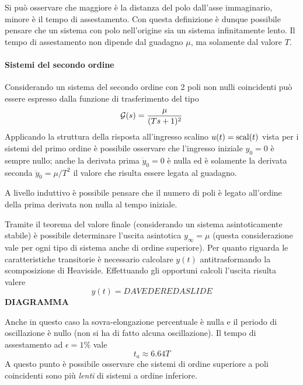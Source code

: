 		\begin{nota}
			Si può osservare che maggiore è la distanza del polo dall'asse immaginario, minore è il tempo di assestamento. Con questa definizione è dunque possibile pensare che un sistema con polo nell'origine sia un sistema infinitamente lento. Il tempo di assestamento non dipende dal guadagno $\mu$, ma solamente dal valore $T$.
		\end{nota}
		
		
		\paragraph{Sistemi del secondo ordine} Considerando un sistema del secondo ordine con 2 poli non nulli  coincidenti può essere espresso dalla funzione di trasferimento del tipo
		\[ \mathcal G(s) = \frac{\mu}{(Ts+1)^2} \]
		Applicando la struttura della risposta all'ingresso scalino $u(t)=\textrm{scal}(t)$ vista per i sistemi del primo ordine è possibile osservare che l'ingresso iniziale $y_0=0$ è sempre nullo; anche la derivata prima $\dot y_0=0$ è nulla ed è solamente la derivata seconda $\ddot y_0 = \mu/T^2$ il valore che risulta essere legata al guadagno.
		
		\begin{nota}
			A livello induttivo è possibile pensare che il numero di poli è legato all'ordine della prima derivata non nulla al tempo iniziale.
		\end{nota}
		Tramite il teorema del valore finale (considerando un sistema asintoticamente stabile) è possibile determinare l'uscita asintotica $y_\infty=\mu$ (questa considerazione vale per ogni tipo di sistema anche di ordine superiore). Per quanto riguarda le caratteristiche transitorie è necessario calcolare $y(t)$ antitrasformando la scomposizione di Heaviside. Effettuando gli opportuni calcoli l'uscita risulta valere
		\[ y(t) = DA VEDERE DA SLIDE \]
		\textbf{DIAGRAMMA}
		
		Anche in questo caso la sovra-elongazione percentuale è nulla e il periodo di oscillazione è nullo (non si ha di fatto alcuna oscillazione). Il tempo di assestamento ad $\epsilon = 1\%$ vale
		\[t_a \approx 6.64 T\]
		A questo punto è possibile osservare che sistemi di ordine superiore a poli coincidenti sono più \textit{lenti} di sistemi a ordine inferiore.
		
